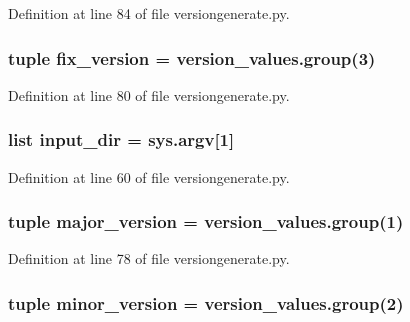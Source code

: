 \-Definition at line 84 of file versiongenerate.\-py.

\hypertarget{namespaceversiongenerate_ab2bab3169056e57b2e0e10df8eac77aa}{
\subsubsection[{fix\-\_\-version}]{\setlength{\rightskip}{0pt plus 5cm}tuple {\bf fix\-\_\-version} = version\-\_\-values.\-group(3)}}\label{d3/d03/namespaceversiongenerate_ab2bab3169056e57b2e0e10df8eac77aa}


\-Definition at line 80 of file versiongenerate.\-py.

\hypertarget{namespaceversiongenerate_ab23e267aae4e1eeda524f6c6feaab267}{
\subsubsection[{input\-\_\-dir}]{\setlength{\rightskip}{0pt plus 5cm}list {\bf input\-\_\-dir} = sys.\-argv\mbox{[}1\mbox{]}}}\label{d3/d03/namespaceversiongenerate_ab23e267aae4e1eeda524f6c6feaab267}


\-Definition at line 60 of file versiongenerate.\-py.

\hypertarget{namespaceversiongenerate_ac557741270717fefb4c17ddc82079890}{
\subsubsection[{major\-\_\-version}]{\setlength{\rightskip}{0pt plus 5cm}tuple {\bf major\-\_\-version} = version\-\_\-values.\-group(1)}}\label{d3/d03/namespaceversiongenerate_ac557741270717fefb4c17ddc82079890}


\-Definition at line 78 of file versiongenerate.\-py.

\hypertarget{namespaceversiongenerate_a0c85aae24f1a132c061845c52511f5a5}{
\subsubsection[{minor\-\_\-version}]{\setlength{\rightskip}{0pt plus 5cm}tuple {\bf minor\-\_\-version} = version\-\_\-values.\-group(2)}}\label{d3/d03/namespaceversiongenerate_a0c85aae24f1a132c061845c52511f5a5}


